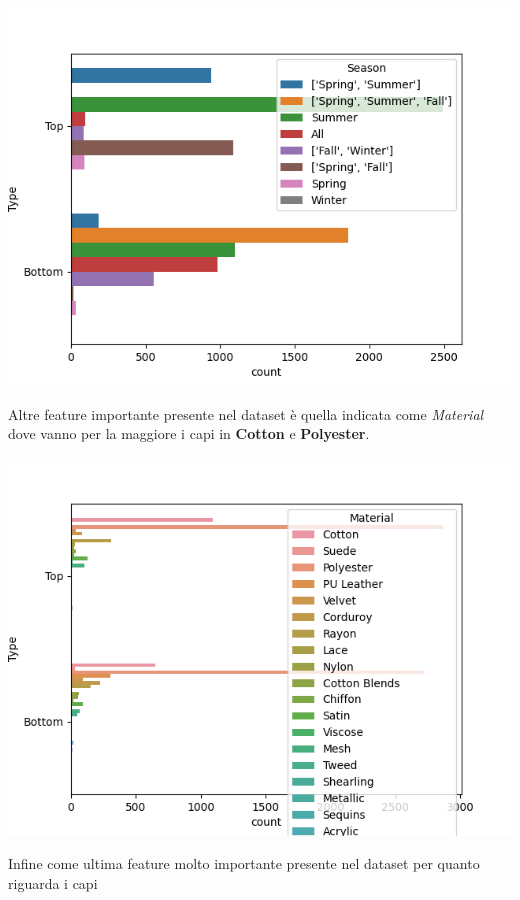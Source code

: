 \documentclass[a4paper, 11pt, oneside]{report}
\begin{document}
                \begin{center}
                    \includegraphics[scale=0.4]{countSeasonTopBottom}
                \end{center}
                \newpage
                \par \noindent Altre feature importante presente nel dataset è quella indicata come \textit{Material}
                dove vanno per la maggiore i capi in \textbf{Cotton} e \textbf{Polyester}.
                \begin{center}
                    \includegraphics[scale=0.4]{countMaterialTopBottom}
                \end{center}
                \bigskip
                \par \noindent Infine come ultima feature molto importante presente nel dataset per quanto riguarda i capi
\end{document}
